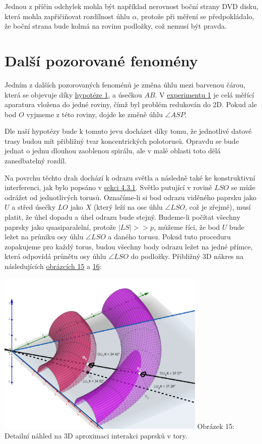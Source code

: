 \documentclass[titlepage]{article}
\begin{document}
Jednou z příčin odchylek mohla být například nerovnost boční strany DVD disku, která mohla zapřičiňovat rozdílnost úhlu $\alpha$, protože při měření se předpokládalo, že boční strana bude kolmá na rovinu podložky, což nemusí být pravda.

 \label{sec:other_fen}
\section{Další pozorované fenomény}

Jedním z dalších pozorovaných fenoménů je změna úhlu mezi barvenou čárou, která se objevuje díky \hyperref[hyp:1]{hypotéze 1}, a úsečkou $AB$.
V \hyperref[exp:1]{experimentu 1} je celá měřící aparatura vložena do jedné roviny, čímž byl problém redukován do 2D.
Pokud ale bod $O$ vyjmeme z této roviny, dojde ke změně úhlu $\angle ASP$.

Dle naší hypotézy bude k tomuto jevu docházet díky tomu, že jednotlivé datové trasy budou mít přibližný tvar koncentrických polotorusů.
Opravdu se bude jednat o jednu dlouhou zaoblenou spirálu, ale v malé oblasti toto dělá zanedbatelný rozdíl.

Na povrchu těchto drah dochází k odrazu světla a následně také ke konstruktivní interferenci, jak bylo popsáno v \hyperref[subsubsec:4.3.1]{sekci 4.3.1}. Světlo putující v rovině $LSO$ se může odrážet od jednotlivých torusů. Označíme-li si bod odrazu viděného paprsku jako $U$ a střed úsečky $LO$ jako $X$ (který leží na ose úhlu $\angle LSO$, což je zřejmé), musí platit, že úhel dopadu a úhel odrazu bude stejný.
Budeme-li počítat všechny paprsky jako quasiparalelní, protože $|LS| >> p$, můžeme říci, že bod $U$ bude ležet na průniku osy úhlu $\angle LSO$ a daného torusu.
Pokud tuto proceduru zopakujeme pro každý torus, budou všechny body odrazu ležet na jedné přímce, která odpovídá průnětu osy úhlu $\angle LSO$ do podložky. Přibližný 3D nákres na následujících \hyperref[image:15]{obrázcích 15} a \hyperref[image:16]{16}:

 \label{image:15}
\begin{center}
    \includegraphics[width = 10cm]{3D_1.png}
    \linebreak
    Obrázek 15: Detailní náhled na 3D aproximaci interakci paprsků v tory.
\end{center}
\end{document}
